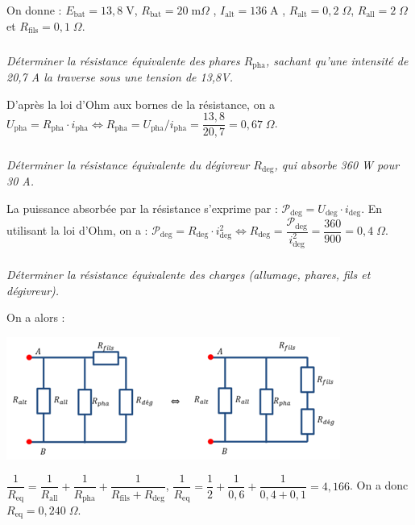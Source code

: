 \documentclass[10pt,fleqn]{book} %
\begin{document}
\begin{multicols}{2}
On donne : $E_{\text{bat}}  = 13,8 \; \text{V}$, $R_{\text{bat}} = 20 \; \text{m}\Omega$ , $I_{\text{alt}}  = 136 \; \text{A}$ , $R_{\text{alt}}  = 0,2 \; \Omega$, $R_{\text{all}}  = 2 \; \Omega$ et $R_{\text{fils}}  = 0,1 \; \Omega$.

\subparagraph{}
\textit{Déterminer la résistance équivalente des phares $R_{\text{pha}}$, sachant qu’une intensité de 20,7 A la traverse sous une tension de 13,8V.}
\ifprof
\begin{corrige}
D’après la loi d’Ohm aux bornes de la résistance, on a $U_\text{pha}=R_\text{pha} \cdot i_\text{pha} \Longleftrightarrow R_\text{pha}=U_\text{pha}/i_\text{pha} =\dfrac{13,8}{20,7}=0,67\; \Omega$. 
\end{corrige}
\else
\fi
\subparagraph{}
\textit{Déterminer la résistance équivalente du dégivreur $R_{\text{deg}}$, qui absorbe 360 W pour 30 A.}
\ifprof
\begin{corrige}
La puissance absorbée par la résistance s’exprime par : $\mathcal{P}_\text{deg}=U_\text{deg} \cdot i_\text{deg}$. 
En utilisant la loi d’Ohm, on a :
$\mathcal{P}_\text{deg}=R_\text{deg}\cdot i_\text{deg}^2 \Longleftrightarrow R_\text{deg}=\dfrac{\mathcal{P}_\text{deg}}{i_\text{deg}^2 }=\dfrac{360}{900}=0,4 \; \Omega$.

\end{corrige}
\else
\fi

\subparagraph{}
\textit{Déterminer la résistance équivalente des charges (allumage, phares, fils et dégivreur).}
\ifprof
\begin{corrige}
On a alors : 
\begin{center}
\includegraphics[width=.9\linewidth]{images/cor_01}
\end{center}
$\dfrac{1}{R_\text{eq}} =\dfrac{1}{R_\text{all}} +\dfrac{1}{R_\text{pha}} +\dfrac{1}{R_\text{fils}+R_\text{deg} }$, $\dfrac{1}{R_\text{eq}}=\dfrac{1}{2}+\dfrac{1}{0,6}+\dfrac{1}{0,4+0,1}=4,166$.
On a donc $R_\text{eq}=0,240 \;\Omega$.

\end{corrige}
\else
\fi



\end{multicols}
\end{document}

